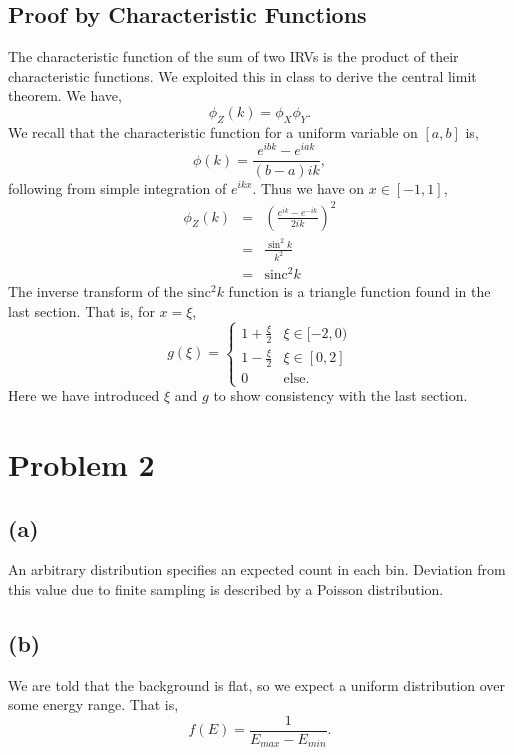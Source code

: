 \documentclass[12pt]{article}
\begin{document}
\subsection*{Proof by Characteristic Functions}
The characteristic function of the sum of two IRVs is the product of their characteristic functions.  We exploited this in class to derive the central limit theorem.  We have,
\begin{equation}
\phi_Z(k) = \phi_X \phi_Y.
\end{equation}
We recall that the characteristic function for a uniform variable on $[a,b]$ is,
\begin{equation}
\phi(k) = \frac{e^{ibk} - e^{iak}}{(b - a) i k},
\end{equation}
following from simple integration of $e^{ikx}$. Thus we have on $x \in [-1,1]$,
\begin{eqnarray}
\phi_Z(k) &=& \left(\frac{e^{ik} - e^{-ik}}{2 i k}\right)^2\\
&=& \frac{\sin^2 k}{k^2}\\
&=& \text{sinc}^2 k
\end{eqnarray}
The inverse transform of the $\text{sinc}^2 k$ function is a triangle function found in the last section.  That is, for $x = \xi$,
\begin{equation}
g(\xi) = \begin{cases} 1 + \frac{ \xi}{2} & \xi \in [-2,0) \\ 1 - \frac{\xi}{2} & \xi \in [0,2] \\ 0 & \text{else}. \end{cases}
\end{equation}
Here we have introduced $\xi$ and $g$ to show consistency with the last section.  
\section*{Problem 2}
\subsection*{(a)}
An arbitrary distribution specifies an expected count in each bin.  Deviation from this value due to finite sampling is described by a Poisson distribution.  
\subsection*{(b)}
We are told that the background is flat, so we expect a uniform distribution over some energy range.  That is,
\begin{equation}
f(E) = \frac{1}{E_{max} - E_{min}}.
\end{equation}
\end{document}

